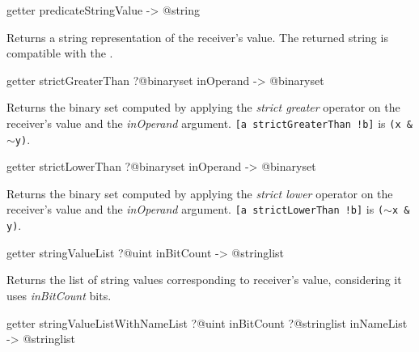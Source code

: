 \begin{galgasbox}
getter predicateStringValue -> @string
\end{galgasbox}

Returns a string representation of the receiver's value. The returned string is compatible with the .








\begin{galgasbox}
getter strictGreaterThan ?@binaryset inOperand -> @binaryset
\end{galgasbox}

Returns the binary set computed by applying the \emph{strict greater} operator on the receiver's value and the \emph{inOperand} argument.
{\texttt{[a strictGreaterThan !b]} is \texttt{(x \& $\sim$y)}.}








\begin{galgasbox}
getter strictLowerThan ?@binaryset inOperand -> @binaryset
\end{galgasbox}

Returns the binary set computed by applying the \emph{strict lower} operator on the receiver's value and the \emph{inOperand} argument.
{\texttt{[a strictLowerThan !b]} is \texttt{($\sim$x \& y)}.}








\begin{galgasbox}
getter stringValueList ?@uint inBitCount -> @stringlist
\end{galgasbox}

Returns the list of string values corresponding to receiver's value, considering it uses \emph{inBitCount} bits.








\begin{galgasbox}
getter stringValueListWithNameList
  ?@uint inBitCount
  ?@stringlist inNameList
  -> @stringlist
\end{galgasbox}



